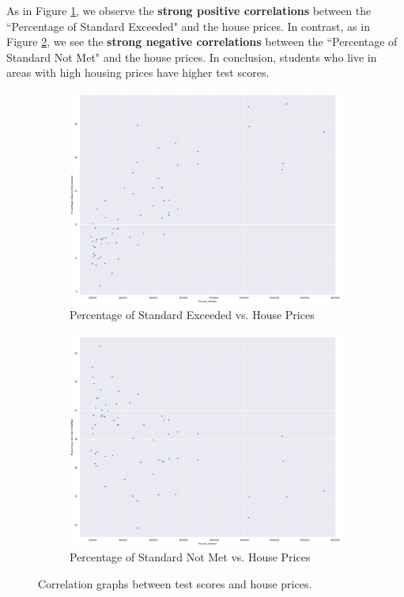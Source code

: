 \documentclass[11pt]{article}
\begin{document}
As in Figure \ref{fig:house_price_vs_best}, we observe the \textbf{strong positive correlations} between the ``Percentage of Standard Exceeded" and the house prices. 
In contrast, as in Figure \ref{fig:house_price_vs_worst}, we see the \textbf{strong negative correlations} between the ``Percentage of Standard Not Met" and the house prices. 
%
In conclusion, students who live in areas with high housing prices have higher test scores.

\begin{figure}[h!]
\centering
\begin{subfigure}{0.48\textwidth}
         \centering
         \includegraphics[width=\textwidth]{output_67_0.png}
         \caption{Percentage of Standard Exceeded vs. House Prices}
         \label{fig:house_price_vs_best}
\end{subfigure}
\hfill
\begin{subfigure}{0.48\textwidth}
         \centering
         \includegraphics[width=\textwidth]{output_68_0.png}
         \caption{Percentage of Standard Not Met vs. House Prices}
         \label{fig:house_price_vs_worst}
\end{subfigure}
\caption{Correlation graphs between test scores and house prices.}
\label{fig:house_price_score_performance}
\end{figure}
\end{document}
